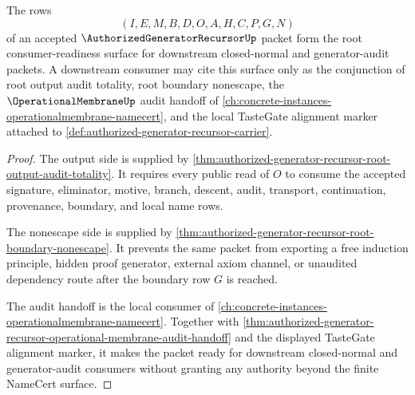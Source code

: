 \begin{theorem}
\label{thm:authorized-generator-recursor-root-namecert-consumer-readiness}
The rows
$$
(I,E,M,B,D,O,A,H,C,P,G,N)
$$
of an accepted $\AuthorizedGeneratorRecursorUp$ packet form the root
consumer-readiness surface for downstream closed-normal and generator-audit
packets. A downstream consumer may cite this surface only as the conjunction
of root output audit totality, root boundary nonescape, the
$\OperationalMembraneUp$ audit handoff of
\autoref{ch:concrete-instances-operationalmembrane-namecert}, and the local
TasteGate alignment marker attached to
\autoref{def:authorized-generator-recursor-carrier}.
\end{theorem}
\begin{proof}
The output side is supplied by
\autoref{thm:authorized-generator-recursor-root-output-audit-totality}. It
requires every public read of $O$ to consume the accepted signature,
eliminator, motive, branch, descent, audit, transport, continuation,
provenance, boundary, and local name rows.

The nonescape side is supplied by
\autoref{thm:authorized-generator-recursor-root-boundary-nonescape}. It
prevents the same packet from exporting a free induction principle, hidden
proof generator, external axiom channel, or unaudited dependency route after
the boundary row $G$ is reached.

The audit handoff is the local consumer of
\autoref{ch:concrete-instances-operationalmembrane-namecert}. Together with
\autoref{thm:authorized-generator-recursor-operational-membrane-audit-handoff}
and the displayed TasteGate alignment marker, it makes the packet ready for
downstream closed-normal and generator-audit consumers without granting any
authority beyond the finite NameCert surface.
\end{proof}

